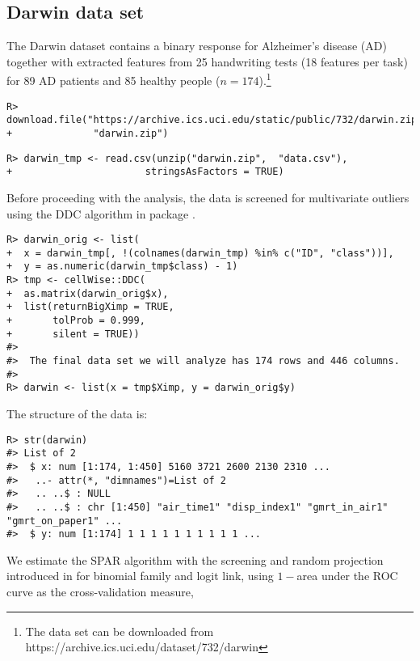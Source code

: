 \documentclass[
  article]{jss}
\begin{document}
\subsection{Darwin data set}\label{darwin-data-set}

The Darwin dataset \citep{CILIA2022darwin} contains a binary response
for Alzheimer's disease (AD) together with extracted features from 25
handwriting tests (18 features per task) for 89 AD patients and 85
healthy people
(\(n=174\)).\footnote{The data set can be downloaded from  https://archive.ics.uci.edu/dataset/732/darwin}

\begin{verbatim}
R> download.file("https://archive.ics.uci.edu/static/public/732/darwin.zip",
+              "darwin.zip")
\end{verbatim}

\begin{verbatim}
R> darwin_tmp <- read.csv(unzip("darwin.zip",  "data.csv"), 
+                       stringsAsFactors = TRUE)
\end{verbatim}

Before proceeding with the analysis, the data is screened for
multivariate outliers using the DDC algorithm in package 
\citep{rcellwise}.

\begin{verbatim}
R> darwin_orig <- list(
+  x = darwin_tmp[, !(colnames(darwin_tmp) %in% c("ID", "class"))],
+  y = as.numeric(darwin_tmp$class) - 1)
R> tmp <- cellWise::DDC(
+  as.matrix(darwin_orig$x),
+  list(returnBigXimp = TRUE, 
+       tolProb = 0.999,
+       silent = TRUE))
#>  
#>  The final data set we will analyze has 174 rows and 446 columns.
#> 
R> darwin <- list(x = tmp$Ximp, y = darwin_orig$y)
\end{verbatim}

The structure of the data is:

\begin{verbatim}
R> str(darwin)
#> List of 2
#>  $ x: num [1:174, 1:450] 5160 3721 2600 2130 2310 ...
#>   ..- attr(*, "dimnames")=List of 2
#>   .. ..$ : NULL
#>   .. ..$ : chr [1:450] "air_time1" "disp_index1" "gmrt_in_air1" "gmrt_on_paper1" ...
#>  $ y: num [1:174] 1 1 1 1 1 1 1 1 1 1 ...
\end{verbatim}

We estimate the SPAR algorithm with the screening and random projection
introduced in \citet{parzer2024glms} for binomial family and logit link,
using \(1-\)area under the ROC curve as the cross-validation measure,
\end{document}
